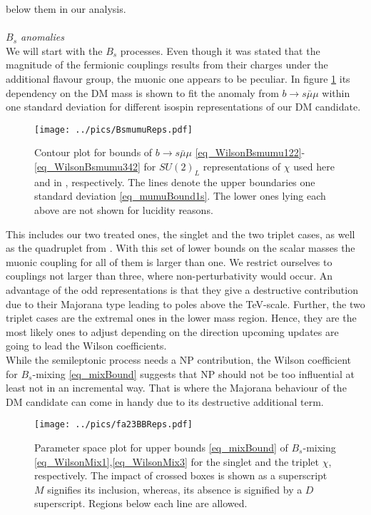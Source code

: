 below them in our analysis. 
\\ \\ \textit{$B_s$ anomalies}\\
\noindent We will start with the $B_s$ processes. Even though it was stated that the magnitude of the fermionic couplings results from their charges
under the additional flavour group, the muonic one appears to be peculiar. In figure \ref{pic_BsMumuReps} its dependency on
the DM mass is shown to fit the anomaly from $b\rightarrow s\bar\mu\mu$ within one standard deviation for different isospin representations of our DM
candidate. 
\begin{figure}[t]
 \texttt{[image: ../pics/BsmumuReps.pdf]}
 \caption{Contour plot for bounds of $b\rightarrow s\bar\mu\mu$  \eqref{eq_WilsonBsmumu122}-\eqref{eq_WilsonBsmumu342} for  $SU(2)_L$ 
 representations of $\chi$ used here and in \cite{Grip}, respectively.  The lines denote the upper boundaries one standard deviation 
 \eqref{eq_mumuBound1s}. The lower ones lying each above are not shown for lucidity reasons.}
 \label{pic_BsMumuReps}
\end{figure}
This includes our two treated ones, the singlet and the two triplet cases, as well as the quadruplet from \cite{Grip}. 
With this set of lower bounds on the scalar masses the muonic coupling for all of them is larger than one. We restrict
ourselves to couplings not larger than three, where non-perturbativity would occur. An advantage of the odd representations is
that they give a destructive contribution due to their Majorana type leading to poles above the TeV-scale. Further, the two triplet cases
are the extremal ones in the lower mass region. Hence, they are the most likely ones to adjust depending on the direction upcoming updates are 
going to lead the Wilson coefficients.\\
\noindent While the semileptonic process needs a NP contribution, the Wilson coefficient 
for $B_s$-mixing \eqref{eq_mixBound} suggests that NP should not be too influential at least not in an incremental way. That is where the Majorana
behaviour of the DM candidate can come in handy due to its destructive additional term. 
\begin{figure}[t]
 \texttt{[image: ../pics/fa23BBReps.pdf]}
 \caption{Parameter space plot for upper bounds \eqref{eq_mixBound} of $B_s$-mixing \eqref{eq_WilsonMix1},\eqref{eq_WilsonMix3} for the singlet and 
 the triplet $\chi$, respectively. The impact of crossed boxes is shown as a superscript $M$ signifies its inclusion, whereas, its absence is
 signified by a $D$ superscript. Regions below each line are allowed.}
 \label{pic_BsMixRepsMajorana}
\end{figure}
